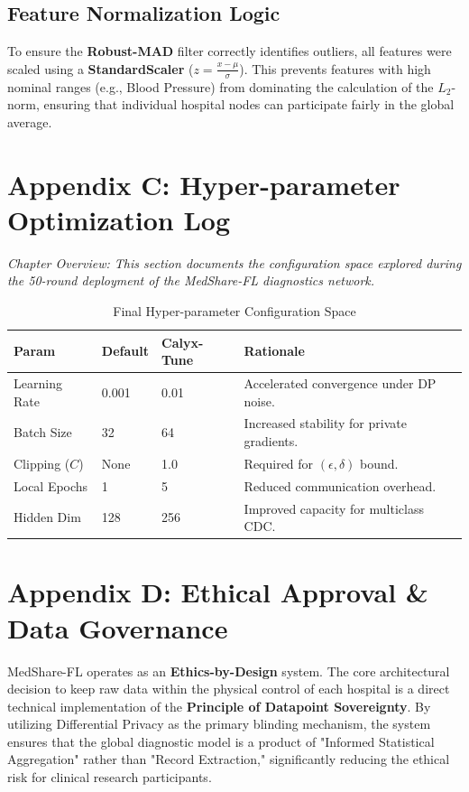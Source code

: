 \documentclass[10pt, a4paper, twocolumn]{article}
\begin{document}
\subsection*{Feature Normalization Logic}
To ensure the \textbf{Robust-MAD} filter correctly identifies outliers, all features were scaled using a \textbf{StandardScaler} ($z = \frac{x - \mu}{\sigma}$). This prevents features with high nominal ranges (e.g., Blood Pressure) from dominating the calculation of the $L_2$-norm, ensuring that individual hospital nodes can participate fairly in the global average.

\section*{Appendix C: Hyper-parameter Optimization Log}

\textit{Chapter Overview: This section documents the configuration space explored during the 50-round deployment of the MedShare-FL diagnostics network.}

\begin{table}[hbt!]
\centering
\scriptsize
\begin{tabular}{lp{1.5cm}p{1.5cm}p{2.5cm}}
\toprule
\textbf{Param} & \textbf{Default} & \textbf{Calyx-Tune} & \textbf{Rationale} \\
\midrule
Learning Rate & 0.001 & 0.01 & Accelerated convergence under DP noise. \\
Batch Size & 32 & 64 & Increased stability for private gradients. \\
Clipping ($C$) & None & 1.0 & Required for $(\epsilon, \delta)$ bound. \\
Local Epochs & 1 & 5 & Reduced communication overhead. \\
Hidden Dim & 128 & 256 & Improved capacity for multiclass CDC. \\
\bottomrule
\end{tabular}
\caption{Final Hyper-parameter Configuration Space}
\end{table}

\section*{Appendix D: Ethical Approval \& Data Governance}
MedShare-FL operates as an \textbf{Ethics-by-Design} system. The core architectural decision to keep raw data within the physical control of each hospital is a direct technical implementation of the \textbf{Principle of Datapoint Sovereignty}. By utilizing Differential Privacy as the primary blinding mechanism, the system ensures that the global diagnostic model is a product of "Informed Statistical Aggregation" rather than "Record Extraction," significantly reducing the ethical risk for clinical research participants.
\end{document}
